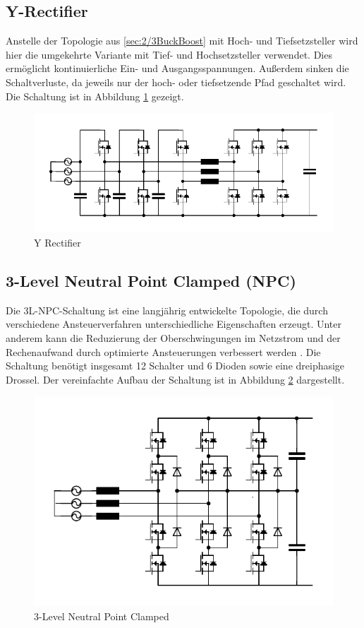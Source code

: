 		
	\subsection{Y-Rectifier}
		Anstelle der Topologie aus \ref{sec:2/3BuckBoost} mit Hoch- und Tiefsetzsteller wird hier die umgekehrte Variante mit Tief- und Hochsetzsteller verwendet. Dies ermöglicht kontinuierliche Ein- und Ausgangsspannungen. Außerdem sinken die Schaltverluste, da jeweils nur der hoch- oder tiefsetzende Pfad geschaltet wird. Die Schaltung ist in Abbildung \ref{fig:y-rectifier} gezeigt.
		
	
		\begin{figure}
			\centering
			\includegraphics[width=1\linewidth]{content/Grafiken/Y-Rectifier}
			\caption{Y Rectifier}
			\label{fig:y-rectifier}
		\end{figure}
	
	\subsection{3-Level Neutral Point Clamped (NPC)}
		Die 3L-\gls{NPC}-Schaltung ist eine langjährig entwickelte Topologie, die durch verschiedene Ansteuerverfahren unterschiedliche Eigenschaften erzeugt. Unter anderem kann die Reduzierung der Oberschwingungen im Netzstrom und der Rechenaufwand durch optimierte Ansteuerungen verbessert werden \cite{NPC}. Die Schaltung benötigt insgesamt 12 Schalter und 6 Dioden sowie eine dreiphasige Drossel. Der vereinfachte Aufbau der Schaltung ist in Abbildung \ref{fig:3l-npc} dargestellt.
		\begin{figure}
			\centering
			\includegraphics[width=1\linewidth]{content/Grafiken/3L-NPC}
			\caption{3-Level Neutral Point Clamped}
			\label{fig:3l-npc}
		\end{figure}

